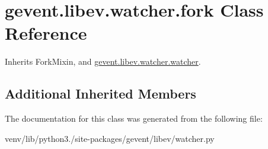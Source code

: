 \hypertarget{classgevent_1_1libev_1_1watcher_1_1fork}{}\section{gevent.\+libev.\+watcher.\+fork Class Reference}
\label{classgevent_1_1libev_1_1watcher_1_1fork}


Inherits Fork\+Mixin, and \hyperlink{classgevent_1_1libev_1_1watcher_1_1watcher}{gevent.\+libev.\+watcher.\+watcher}.

\subsection*{Additional Inherited Members}


The documentation for this class was generated from the following file\+:\begin{DoxyCompactItemize}
\item 
venv/lib/python3./site-\/packages/gevent/libev/watcher.\+py\end{DoxyCompactItemize}
